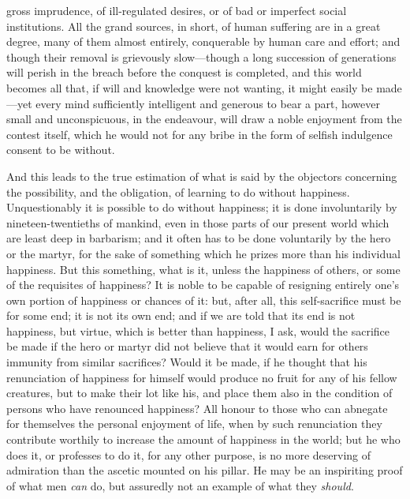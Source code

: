 gross imprudence, of ill-regulated desires, or of bad or imperfect
social institutions. All the grand sources, in short, of human
suffering are in a great degree, many of them almost entirely,
conquerable by human care and effort; and though their removal is
grievously slow---though a long succession of generations will perish
in the breach before the conquest is completed, and this world becomes
all that, if will and knowledge were not wanting, it might easily be
made---yet every mind sufficiently intelligent and generous to bear a
part, however small and unconspicuous, in the endeavour, will draw a
noble enjoyment from the contest itself, which he would not for any
bribe in the form of selfish indulgence consent to be without.

And this leads to the true estimation of what is said by the objectors
concerning the possibility, and the obligation, of learning to do
without happiness. Unquestionably it is possible to do without
happiness; it is done involuntarily by nineteen-twentieths of mankind,
even in those parts of our present world which are least deep in
barbarism; and it often has to be done voluntarily by the hero or the
martyr, for the sake of something which he prizes more than his
 individual happiness. But this something, what is it, unless
the happiness of others, or some of the requisites of happiness? It is
noble to be capable of resigning entirely one's own portion of
happiness or chances of it: but, after all, this self-sacrifice must
be for some end; it is not its own end; and if we are told that its
end is not happiness, but virtue, which is better than happiness, I
ask, would the sacrifice be made if the hero or martyr did not believe
that it would earn for others immunity from similar sacrifices? Would
it be made, if he thought that his renunciation of happiness for
himself would produce no fruit for any of his fellow creatures, but to
make their lot like his, and place them also in the condition of
persons who have renounced happiness? All honour to those who can
abnegate for themselves the personal enjoyment of life, when by such
renunciation they contribute worthily to increase the amount of
happiness in the world; but he who does it, or professes to do it, for
any other purpose, is no more deserving of admiration than the ascetic
mounted on his pillar. He may be an inspiriting proof of what men
\textit{can} do, but assuredly not an example of what they
\textit{should}.

